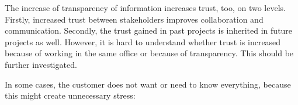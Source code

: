 %
% 
%
%
%

 The increase of transparency of information increases trust, too, on two levels. Firstly, increased trust between stakeholders improves collaboration and communication. Secondly, the trust gained in past projects %
is inherited %
in future projects as well. However, it is hard to understand whether trust is increased because of working in the same office or because of transparency. This should be %
{further} investigated. %

 In some cases, the customer does not want or need to know everything, because this might create unnecessary stress: %

